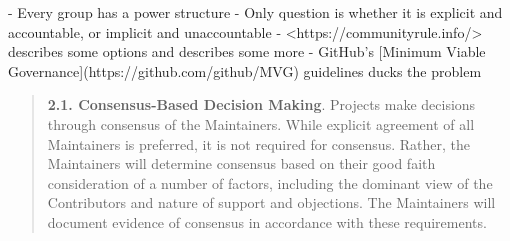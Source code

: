 \documentclass[10pt,letterpaper]{article}
\begin{document}
\begin{markdown}

- Every group has a power structure
  - Only question is whether it is explicit and accountable, or implicit and unaccountable \cite{Freeman1972}
- <https://communityrule.info/> describes some options and \cite{Fogel2021} describes some more
- GitHub's [Minimum Viable Governance](https://github.com/github/MVG) guidelines ducks the problem

\begin{quotation}
  \textbf{2.1. Consensus-Based Decision Making}.
  Projects make decisions through consensus of the Maintainers.
  While explicit agreement of all Maintainers is preferred, it is not required for consensus.
  Rather, the Maintainers will determine consensus based on their good faith consideration of a number of factors,
  including the dominant view of the Contributors and nature of support and objections.
  The Maintainers will document evidence of consensus in accordance with these requirements.
\end{quotation}


\end{markdown}
\end{document}
